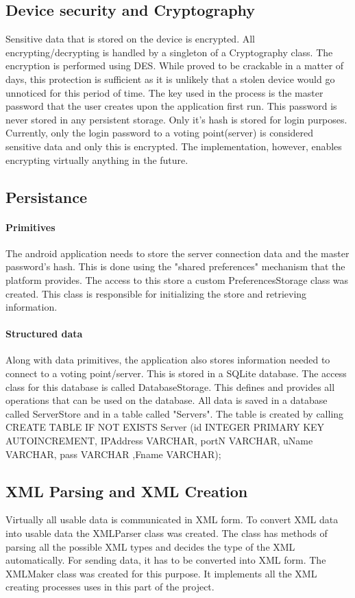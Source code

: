 \documentclass[11pt,twoside,a4paper]{book}
\begin{document}
\subsection{Device security and Cryptography}
Sensitive data that is stored on the device is encrypted. All encrypting/decrypting is handled by a singleton of a Cryptography class. The encryption is performed using DES\cite{des}. While proved to be crackable in a matter of days, this protection is sufficient as it is unlikely that a stolen device would go unnoticed for this period of time.  The key used in the process is the master password that the user creates upon the application first run. This password is never stored in any persistent storage. Only it's hash is stored for login purposes.	 Currently, only the login password to a voting point(server)  is considered sensitive data and only this is encrypted. The implementation, however, enables encrypting virtually anything in the future.
\subsection{Persistance}
\paragraph{Primitives}The android application needs to store the server connection data and the master password's hash. This is done using the "shared preferences" mechanism that the platform provides. The access to this store a custom PreferencesStorage class was created. This class is responsible for initializing the store and retrieving information. \\
\paragraph{Structured data}
Along with data primitives, the application also stores information needed to connect to a voting point/server. This is stored in a SQLite database. The access class for this database is called DatabaseStorage. This defines and provides all operations that can be used on the database. All data is saved in a database called ServerStore and in a table called "Servers". The table is created by calling 
CREATE TABLE IF NOT EXISTS Server (id INTEGER PRIMARY KEY AUTOINCREMENT, IPAddress VARCHAR, portN VARCHAR, uName VARCHAR, pass VARCHAR ,Fname VARCHAR);
\subsection{XML Parsing and XML Creation}
Virtually all usable data is communicated in XML form. To convert XML data into usable data the XMLParser class was created. The class has methods of parsing all the possible XML types and decides the type of the XML automatically. For sending data, it has to be converted into XML form. The XMLMaker class was created for this purpose. It implements all the XML creating processes uses in this part of the project.
\end{document}
